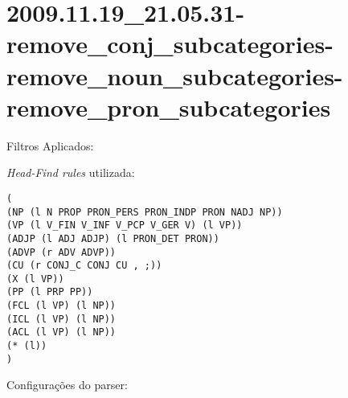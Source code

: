 \section{2009.11.19_21.05.31-remove_conj_subcategories-remove_noun_subcategories-remove_pron_subcategories} %
\label{sec:exp:2009.11.19_21.05.31-remove_conj_subcategories-remove_noun_subcategories-remove_pron_subcategories}

Filtros Aplicados:

\begin{itemize}
  
  \item{\emph{RemoveConjSubcategories}
  
  \item{\emph{RemoveNounSubcategories}
  
  \item{\emph{RemovePronSubcategories}
  
\end{itemize}

\emph{Head-Find rules} utilizada:

\scriptsize
\begin{verbatim}
(
(NP (l N PROP PRON_PERS PRON_INDP PRON NADJ NP))
(VP (l V_FIN V_INF V_PCP V_GER V) (l VP))
(ADJP (l ADJ ADJP) (l PRON_DET PRON))
(ADVP (r ADV ADVP))
(CU (r CONJ_C CONJ CU , ;))
(X (l VP))
(PP (l PRP PP))
(FCL (l VP) (l NP))
(ICL (l VP) (l NP))
(ACL (l VP) (l NP))
(* (l))
)

\end{verbatim}

\normalsize

Configurações do parser:

